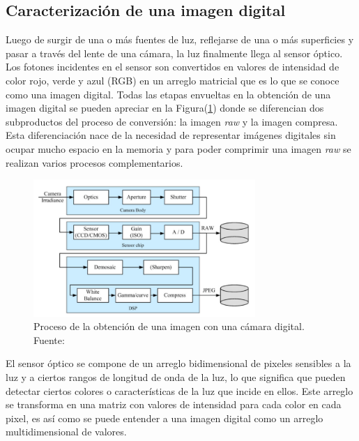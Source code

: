     \subsection{Caracterización de una imagen digital}
    Luego de surgir de una o más fuentes de luz, reflejarse de una o más superficies y pasar a través del lente de una cámara, 
    la luz finalmente llega al sensor óptico. Los fotones incidentes en el sensor son convertidos en valores de intensidad de 
    color rojo, verde y azul (RGB) en un arreglo matricial que es lo que se conoce como una imagen digital. Todas las etapas 
    envueltas en la obtención de una imagen digital se pueden apreciar en la Figura(\ref{fig:digitalcam}) donde se diferencian 
    dos subproductos del proceso de conversión: la imagen \textit{raw} y la imagen compresa. Esta diferenciación nace de la 
    necesidad de representar imágenes digitales sin ocupar mucho espacio en la memoria y para poder comprimir una imagen 
    \textit{raw} se realizan varios procesos complementarios.

    \begin{figure}[!h] 
        \centering
        \includegraphics[width=0.75\textwidth]{img/digitalcam}
        \caption{Proceso de la obtención de una imagen con una cámara digital. Fuente: \cite{Szeliski2011} }
        \label{fig:digitalcam}
    \end{figure}

    El sensor óptico se compone de un arreglo bidimensional de pixeles sensibles a la luz y a ciertos rangos de longitud de onda de 
    la luz, lo que significa que pueden detectar ciertos colores o características de la luz que incide en ellos. Este arreglo 
    se transforma en una matriz con valores de intensidad para cada color en cada pixel, es así como se puede entender 
    a una imagen digital como un arreglo multidimensional de valores. 

